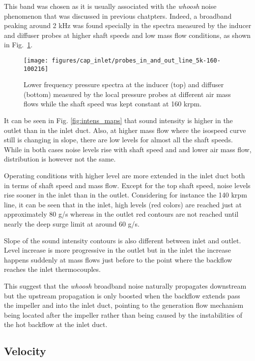 This band was chosen as it is usually associated with the \emph{whoosh} noise \cite{evans2005minimizing,trochon2001new} phenomenon that was discussed in previous chatpters. Indeed, a broadband peaking around 2 kHz was found specially in the spectra measured by the inducer and diffuser probes at higher shaft speeds and low mass flow conditions, as shown in Fig.~\ref{fig:probes_5K}.

\begin{figure}[thb!]
\centering
\texttt{[image: figures/cap\_inlet/probes\_in\_and\_out\_line\_5k-160-100216]}
\caption{Lower frequency pressure spectra at the inducer (top) and diffuser (bottom) measured by the local pressure probes at different air mass flows while the shaft speed was kept constant at 160 krpm.}
\label{fig:probes_5K}
\end{figure}

It can be seen in Fig. \ref{fig:intens_maps} that sound intensity is higher in the outlet than in the inlet duct. Also, at higher mass flow where the isospeed curve still is changing in slope, there are low levels for almost all the shaft speeds. While in both cases noise levels rise with shaft speed and and lower air mass flow, distribution is however not the same.

Operating conditions with higher level are more extended in the inlet duct both in terms of shaft speed and mass flow. Except for the top shaft speed, noise levels rise sooner in the inlet than in the outlet. Considering for instance the 140 krpm line, it can be seen that in the inlet, high levels (red colors) are reached just at approximately 80 g/s whereas in the outlet red contours are not reached until nearly the deep surge limit at around 60 g/s.

Slope of the sound intensity contours is also different between inlet and outlet. Level increase is more progressive in the outlet but in the inlet the increase happens suddenly at mass flows just before to the point where the backflow reaches the inlet thermocouples.

This suggest that the \emph{whoosh} broadband noise naturally propagates downstream but the upstream propagation is only boosted when the backflow extends pass the impeller and into the inlet duct, pointing to the generation flow mechanism being located after the impeller rather than being caused by the instabilities of the hot backflow at the inlet duct.

\subsection{Velocity}
\label{sub:velocity}

